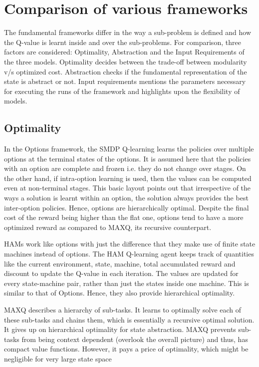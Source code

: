 \section{Comparison of various frameworks}

The fundamental frameworks differ in the way a sub-problem is defined and how the Q-value is learnt inside and over the sub-problems. For comparison, three factors are considered: Optimality, Abstraction and the Input Requirements of the three models. Optimality decides between the trade-off between modularity v/s optimized cost. Abstraction checks if the fundamental representation of the state is abstract or not. Input requirements mentions the parameters necessary for executing the runs of the framework and highlights upon the flexibility of models. 

\subsection{Optimality}


In the Options framework, the SMDP Q-learning learns the policies over multiple options at the terminal states of the options. It is assumed here that the policies with an option are complete and frozen i.e. they do not change over stages. On the other hand, if intra-option learning is used, then the values can be computed even at non-terminal stages. This basic layout points out that irrespective of the ways a solution is learnt within an option, the solution always provides the best inter-option policies. Hence, options are hierarchically optimal. Despite the final cost of the reward being higher than the flat one, options tend to have a more optimized reward as compared to MAXQ, its recursive counterpart. 

HAMs work like options with just the difference that they make use of finite state machines instead of options. The HAM Q-learning agent keeps track of quantities like the current environment, state, machine, total accumulated reward and discount to update the Q-value in each iteration.  The values are updated for every state-machine pair, rather than just the states inside one machine. This is similar to that of Options. Hence, they also provide hierarchical optimality. 
 
MAXQ describes a hierarchy of sub-tasks. It learns to optimally solve each of these sub-tasks and chains them, which is essentially a recursive optimal solution. It gives up on hierarchical optimality for state abstraction. MAXQ prevents sub-tasks from being context dependent (overlook the overall picture) and thus, has compact value functions. However, it pays a price of optimality, which might be negligible for very large state space

